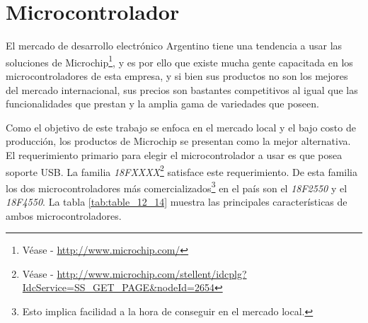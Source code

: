 \section{Microcontrolador} %
El mercado de desarrollo electr\'onico Argentino tiene una tendencia a usar las
soluciones de Microchip\footnote{V\'ease - \url{http://www.microchip.com/}}, y
es por ello que existe mucha gente capacitada en los microcontroladores de esta
empresa, y si bien sus productos no son los mejores del mercado internacional,
sus precios son bastantes competitivos al igual que las funcionalidades que
prestan y la amplia gama de variedades que poseen.\

Como el objetivo de este trabajo se enfoca en el mercado local y el bajo costo
de producci\'on, los productos de Microchip se presentan como la mejor
alternativa.\\

El requerimiento primario para elegir el microcontrolador a usar es que posea
soporte USB. La familia \emph{18FXXXX}\footnote{V\'ease - \url{
http://www.microchip.com/stellent/idcplg?IdcService=SS_GET_PAGE&nodeId=2654}}
satisface este requerimiento. De esta familia los dos microcontroladores m\'as
comercializados\footnote{Esto implica facilidad a la hora de conseguir en el
mercado local.} en el pa\'is son el \emph{18F2550} y el \emph{18F4550}. La
tabla \ref{tab:table_12_14} muestra las principales caracter\'isticas de ambos
microcontroladores.

